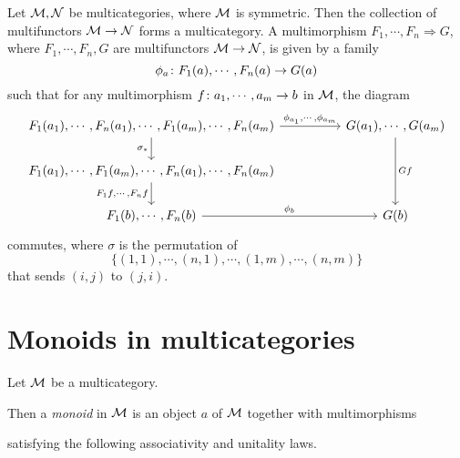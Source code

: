\documentclass{report}[11pt]
\begin{document}
\begin{definition}
  Let $\mathcal M,\mathcal N$ be multicategories, where $\mathcal M$ is symmetric.  
  Then the collection of multifunctors $\mathcal M\to\mathcal N$ forms a multicategory.  
  A multimorphism $F_1,\cdots,F_n\Rightarrow G$, where $F_1,\cdots,F_n,G$ are multifunctors $\mathcal M\to \mathcal N$, is given by a family
  \[
    \phi_a \colon F_1(a),\cdots,F_n(a) \to G(a)
    \]
  such that for any multimorphism $f\colon a_1,\cdots,a_m\to b$ in $\mathcal M$, the diagram
  \[
    \begin{tikzcd}[column sep=48pt]
      F_1(a_1),\cdots,F_n(a_1),\cdots,F_1(a_m),\cdots,F_n(a_m) \arrow[r, "{\phi_{a_1},\cdots,\phi_{a_m}}"] \arrow[d, "\sigma_*"']
        & G(a_1),\cdots,G(a_m) \arrow[dd, "Gf"] \\
      F_1(a_1),\cdots,F_1(a_m),\cdots,F_n(a_1),\cdots,F_n(a_m) \arrow[d, "{F_1f,\cdots,F_nf}"']
        & \\
      F_1(b),\cdots,F_n(b) \arrow[r, "\phi_b"]
        & G(b)
    \end{tikzcd}
    \]
  commutes, where $\sigma$ is the permutation of
  \[
    \{(1,1),\cdots,(n,1),\cdots,(1,m),\cdots,(n,m)\}
    \]
  that sends $(i,j)$ to $(j,i)$.
\end{definition}

\section{Monoids in multicategories}

\begin{definition}
  \label{DefMonoidMulticategory}
Let $\mathcal M$ be a multicategory.  

  Then a \emph{monoid} in $\mathcal M$ is an object $a$ of $\mathcal M$ together with multimorphisms
  satisfying the following associativity and unitality laws.
\end{definition}
\end{document}
